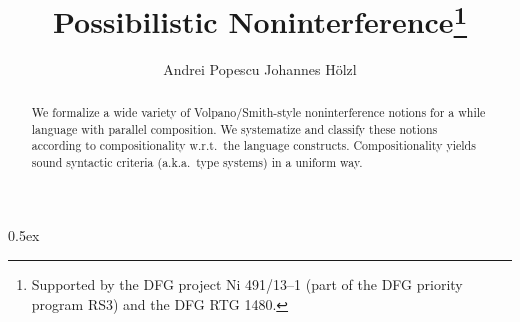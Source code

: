 \documentclass[11pt,a4paper]{article}
\begin{document}
\title{Possibilistic Noninterference\thanks{Supported by the DFG project Ni 491/13--1 (part of the DFG priority program RS3) and the DFG RTG 1480.}
}
\author{Andrei Popescu \hspace*{10ex} Johannes H\"{o}lzl}

\maketitle

\begin{abstract}
We formalize a wide variety of Volpano/Smith-style
noninterference notions for a while language with parallel composition.
We systematize and classify these notions according to compositionality w.r.t.~the language constructs.
Compositionality yields sound syntactic criteria (a.k.a.~type systems) in a uniform way.
\end{abstract}


\tableofcontents

\parindent 0pt\parskip 0.5ex







\end{document}
